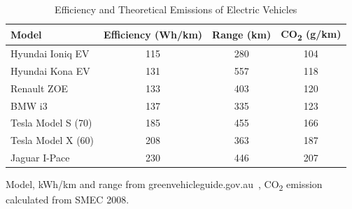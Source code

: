 \begin{table}[H]
	\centering
	\caption{Efficiency and Theoretical Emissions of Electric Vehicles}
	\label{tbl:9:evefficiency}
	\begin{tabular}{lccc}
		\toprule
		Model              & Efficiency (Wh/km) & Range (km) & CO\textsubscript{2} (g/km) \\ \midrule
		Hyundai Ioniq EV   &        115         &    280     &            104             \\
		Hyundai Kona EV    &        131         &    557     &            118             \\
		Renault ZOE        &        133         &    403     &            120             \\
		BMW i3             &        137         &    335     &            123             \\
		Tesla Model S (70) &        185         &    455     &            166             \\
		Tesla Model X (60) &        208         &    363     &            187             \\
		Jaguar I-Pace      &        230         &    446     &            207             \\ \bottomrule
	\end{tabular}
\begin{tablenotes}
	\small
	\item Model, kWh/km and range from greenvehicleguide.gov.au~\cite{department_of_infrastructure_and_regional_development_green_2018}, CO\textsubscript{2} emission calculated from SMEC 2008.
\end{tablenotes}
\end{table}

